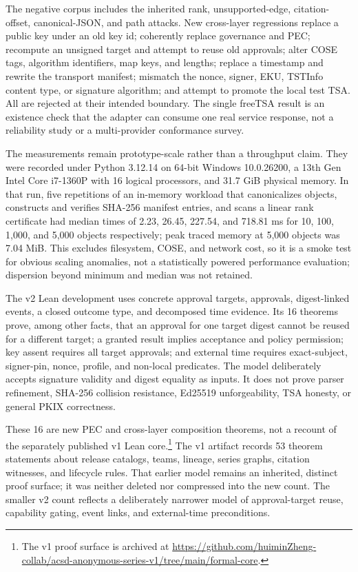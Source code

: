 \documentclass[11pt]{article}
\begin{document}
The negative corpus includes the inherited rank, unsupported-edge,
citation-offset, canonical-JSON, and path attacks. New cross-layer regressions
replace a public key under an old key id; coherently replace governance and PEC;
recompute an unsigned target and attempt to reuse old approvals; alter COSE tags,
algorithm identifiers, map keys, and lengths; replace a timestamp and rewrite
the transport manifest; mismatch the nonce, signer, EKU, TSTInfo content type,
or signature algorithm; and attempt to promote the local test TSA. All are
rejected at their intended boundary. The single freeTSA result is an existence
check that the adapter can consume one real service response, not a reliability
study or a multi-provider conformance survey.

The measurements remain prototype-scale rather than a throughput claim. They
were recorded under Python 3.12.14 on 64-bit Windows 10.0.26200, a 13th Gen
Intel Core i7-1360P with 16 logical processors, and 31.7 GiB physical memory.
In that run, five repetitions of an in-memory workload that canonicalizes
objects, constructs and verifies SHA-256 manifest entries, and scans a linear
rank certificate had median times of 2.23, 26.45, 227.54, and 718.81 ms for
10, 100, 1,000, and 5,000 objects respectively; peak traced memory at 5,000
objects was 7.04 MiB. This excludes filesystem, COSE, and network cost, so it
is a smoke test for obvious scaling anomalies, not a statistically powered
performance evaluation; dispersion beyond minimum and median was not retained.

The v2 Lean development uses concrete approval targets, approvals, digest-linked
events, a closed outcome type, and decomposed time evidence. Its 16 theorems
prove, among other facts, that an approval for one target digest cannot be
reused for a different target; a granted result implies acceptance and policy
permission; key assent requires all target approvals; and external time
requires exact-subject, signer-pin, nonce, profile, and non-local predicates.
The model deliberately accepts signature validity and digest equality as inputs.
It does not prove parser refinement, SHA-256 collision resistance, Ed25519
unforgeability, TSA honesty, or general PKIX correctness.

These 16 are new PEC and cross-layer composition theorems, not a recount of the
separately published v1 Lean core.\footnote{The v1 proof surface is archived at
\url{https://github.com/huiminZheng-collab/acsd-anonymous-series-v1/tree/main/formal-core}.}
The v1 artifact records 53 theorem statements
about release catalogs, teams, lineage, series graphs, citation witnesses, and
lifecycle rules. That earlier model remains an inherited, distinct proof
surface; it was neither deleted nor compressed into the new count. The smaller
v2 count reflects a deliberately narrower model of approval-target reuse,
capability gating, event links, and external-time preconditions.
\end{document}
